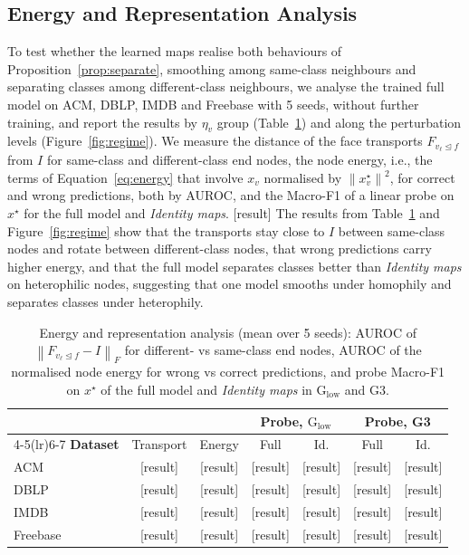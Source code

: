 \documentclass{article}
\newcommand{\norm}[1]{\left\lVert #1\right\rVert}
\newcommand{\res}{{\scriptsize[result]}}
\newcommand{\inc}{\trianglelefteq}
\begin{document}
\subsection{Energy and Representation Analysis}
To test whether the learned maps realise both behaviours of Proposition~\ref{prop:separate}, smoothing among same-class neighbours and separating classes among different-class neighbours, we analyse the trained full model on ACM, DBLP, IMDB and Freebase with 5 seeds, without further training, and report the results by $\eta_v$ group (Table~\ref{tab:regime}) and along the perturbation levels (Figure~\ref{fig:regime}). We measure the distance of the face transports $F_{v_\ell\inc f}$ from $I$ for same-class and different-class end nodes, the node energy, i.e., the terms of Equation~\eqref{eq:energy} that involve $x_v$ normalised by $\norm{x^\star_v}^2$, for correct and wrong predictions, both by AUROC, and the Macro-F1 of a linear probe on $x^\star$ for the full model and \emph{Identity maps}. \res{} The results from Table~\ref{tab:regime} and Figure~\ref{fig:regime} show that the transports stay close to $I$ between same-class nodes and rotate between different-class nodes, that wrong predictions carry higher energy, and that the full model separates classes better than \emph{Identity maps} on heterophilic nodes, suggesting that one model smooths under homophily and separates classes under heterophily.


\begin{table}[!htbp]
  \centering
  \caption{Energy and representation analysis (mean over 5 seeds): AUROC of $\norm{F_{v_\ell\inc f}-I}_F$ for different- vs same-class end nodes, AUROC of the normalised node energy for wrong vs correct predictions, and probe Macro-F1 on $x^\star$ of the full model and \emph{Identity maps} in $\mathrm{G_{low}}$ and G3.}
  \label{tab:regime}
  \scriptsize
  \setlength{\tabcolsep}{3pt}
  \begin{tabular}{lcccccc}
    \toprule
    & & & \multicolumn{2}{c}{Probe, $\mathrm{G_{low}}$} & \multicolumn{2}{c}{Probe, G3} \\
    \cmidrule(lr){4-5}\cmidrule(lr){6-7}
    \textbf{Dataset} & Transport & Energy & Full & Id. & Full & Id. \\
    \midrule
    ACM & \res & \res & \res & \res & \res & \res \\
    DBLP & \res & \res & \res & \res & \res & \res \\
    IMDB & \res & \res & \res & \res & \res & \res \\
    Freebase & \res & \res & \res & \res & \res & \res \\
    \bottomrule
  \end{tabular}
\end{table}
\end{document}
